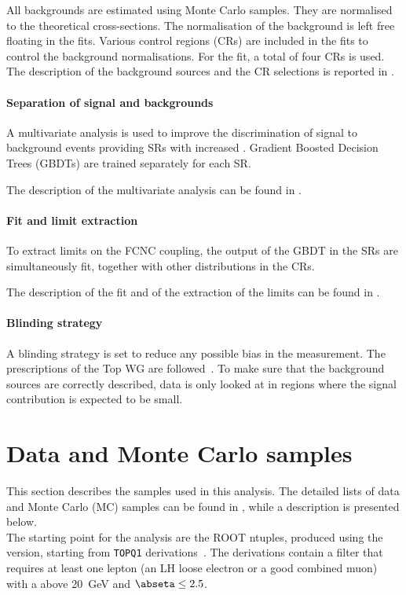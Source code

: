 \noindent All backgrounds are estimated using Monte Carlo samples. They are
normalised to the theoretical cross-sections. The normalisation of the
\ttbar background is left free floating in the fits.
Various control regions (CRs) are included in the fits to control the
background normalisations. For the fit, a total of four CRs is used. 
The description of the background sources and the CR selections is
reported in .

\paragraph{Separation of signal and backgrounds}
A multivariate analysis is used to improve the discrimination of
signal to background events providing SRs with increased \ssb. 
Gradient Boosted Decision Trees (GBDTs) are trained separately for each SR. 

\noindent The description of the multivariate analysis can be found in
. 

\paragraph{Fit and limit extraction}
To extract limits on the FCNC \tZc coupling, the output of the
GBDT in the SRs are simultaneously fit, together with other 
distributions in the CRs. 

\noindent The description of the fit and of the extraction of the limits can be
found in .

\paragraph{Blinding strategy}
A blinding strategy is set to reduce any possible bias in the measurement. 
The prescriptions of the Top WG are followed~\cite{top:blind}.
To make sure that the background sources are correctly described,
data is only looked at in regions where the signal contribution is expected to be small. 

\section{Data and Monte Carlo samples}
\label{sec:samples}
This section describes the samples used in this analysis.
The detailed lists of data and Monte Carlo (MC) samples can be found
in \App{\ref{appendix:app_mc}}, 
while a description is presented below.\\
The starting point for the analysis are the ROOT ntuples, produced using the 
\anabasevers version, starting from \texttt{TOPQ1} derivations~\cite{top:deriv}.
The derivations contain a filter that requires at least one lepton
(an LH loose electron or a good combined muon) with a \pT above \SI{20}{\GeV} and $\abseta \leq 2.5$. 

